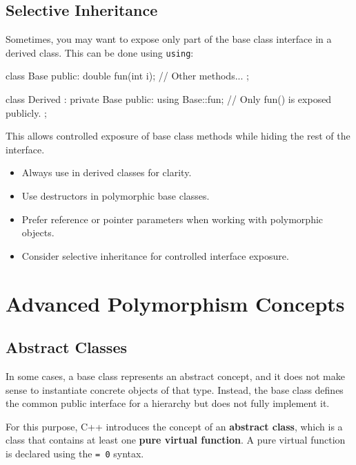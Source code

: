 \subsection{Selective Inheritance}

Sometimes, you may want to expose only part of the base class interface in a derived class. This can be done using \texttt{using}:

\begin{codeblock}[language=C++, numbers=none]
class Base {
public:
    double fun(int i);
    // Other methods...
};

class Derived : private Base {
public:
    using Base::fun; // Only fun() is exposed publicly.
};
\end{codeblock}

This allows controlled exposure of base class methods while hiding the rest of the interface.

\begin{tipsblock}
    \begin{itemize}
        \item Always use  in derived classes for clarity.
        \item Use  destructors in polymorphic base classes.
        \item Prefer reference or pointer parameters when working with polymorphic objects.
        \item Consider selective inheritance for controlled interface exposure.
    \end{itemize}
\end{tipsblock}

\section{Advanced Polymorphism Concepts}

\subsection{Abstract Classes}

In some cases, a base class represents an abstract concept, and it does not make sense to instantiate concrete objects of that type. Instead, the base class defines the common public interface for a hierarchy but does not fully implement it.

For this purpose, C++ introduces the concept of an \textbf{abstract class}, which is a class that contains at least one \textbf{pure virtual function}. A pure virtual function is declared using the \texttt{= 0} syntax.

